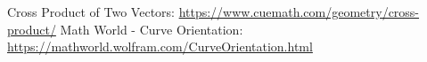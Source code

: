 \documentclass [12pt]{article}
\newtheorem{theorem}{Theorem}[section]
\begin{document}


\begin{thebibliography}{1}
Cross Product of Two Vectors: \url{https://www.cuemath.com/geometry/cross-product/}
Math World - Curve Orientation: \url{https://mathworld.wolfram.com/CurveOrientation.html}
\end{thebibliography}
\end{document}
